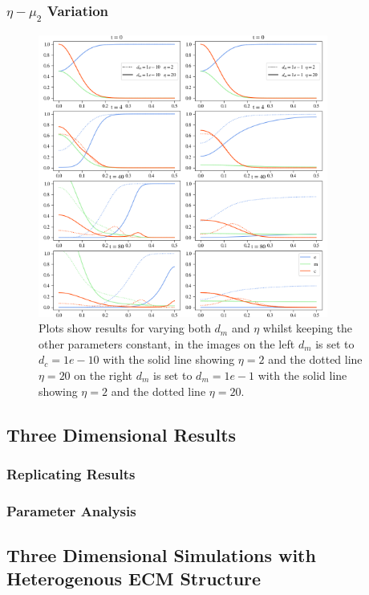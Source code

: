 \subsubsection*{$\eta -\mu_2$ Variation}
\begin{figure}[h]
    \centering
    \includegraphics[width=0.85\textwidth]{resources/images/dm_eta_variation.png}
    \caption{Plots show results for varying both $d_m$ and $\eta$ whilst keeping the other parameters constant, in the images on the left $d_m$ is set to $d_c=1e-10$ with the solid line showing $\eta = 2$ and the dotted line $\eta=20$ on the right $d_m$ is set to $d_m=1e-1$ with the solid line showing $\eta = 2$ and the dotted line $\eta=20$.}
    \label{fig:dm_eta_variation}
\end{figure}






\subsection{Three Dimensional Results}
\subsubsection{Replicating Results}
\subsubsection{Parameter Analysis}
\subsection{Three Dimensional Simulations with Heterogenous ECM Structure}

